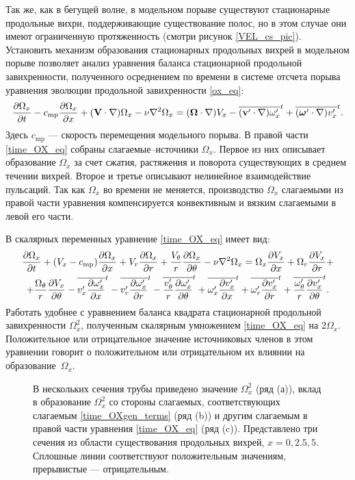 Так же, как в бегущей волне, в модельном порыве существуют стационарные продольные  вихри, поддерживающие существование полос, но в этом случае они имеют ограниченную протяженность (смотри рисунок \ref{VEL_cs_pic}). Установить механизм образования стационарных продольных вихрей в модельном порыве позволяет анализ уравнения баланса стационарной продольной завихренности, полученного осреднением по времени в системе отсчета порыва уравнения эволюции продольной завихренности \eqref{ox_eq}: 
\begin{equation} \label{time_OX_eq}
\frac{\partial \Omega_x}{\partial t} - c_\mathrm{mp} \frac{\partial \Omega_x}{\partial x} + (\mathbf{V} \cdot \nabla) \Omega_x - \nu\nabla^2 \Omega_x = (\mbox{\boldmath$\Omega$} \cdot \nabla) V_x - \overline{(\mathbf{v}' \cdot \nabla) \omega'_x}^t + \overline{(\mbox{\boldmath$\omega$}' \cdot \nabla) v'_x}^t.
\end{equation}
Здесь $c_\mathrm{mp}$ --- скорость перемещения модельного порыва. В правой части \eqref{time_OX_eq} собраны слагаемые--источники $\Omega_x$. Первое из них описывает образование $\Omega_x$ за счет сжатия, растяжения и поворота существующих в среднем течении вихрей. Второе и третье описывают нелинейное взаимодействие пульсаций. Так как $\Omega_x$ во времени не меняется, производство $\Omega_x$ слагаемыми из правой части уравнения компенсируется конвективным и вязким слагаемыми в левой его части. 

В скалярных переменных уравнение \eqref{time_OX_eq} имеет вид:
\begin{multline}\label{time_OX1_eq}
\frac{\partial \Omega_x}{\partial t} + (V_x - c_\mathrm{mp})\frac{\partial \Omega_x}{\partial x} + V_r \frac{\partial \Omega_x}{\partial r} + \frac{V_\theta}{r} \frac{\partial \Omega_x}{\partial \theta} - \nu\nabla^2\Omega_x= \Omega_x \frac{\partial V_x}{\partial x} + \Omega_r \frac{\partial V_x}{\partial r} + \\ + \frac{\Omega_\theta}{r} \frac{\partial V_x}{\partial \theta}
 - \overline{v'_x \frac{\partial \omega'_x}{\partial x}}^t - \overline{v'_r \frac{\partial \omega'_x}{\partial r}}^t - \overline{\frac{v'_\theta}{r} \frac{\partial \omega'_x}{\partial \theta}}^t
 + \overline{\omega'_x \frac{\partial v'_x}{\partial x}}^t + \overline{\omega'_r \frac{\partial v'_x}{\partial r}}^t + \overline{\frac{\omega'_\theta}{r} \frac{\partial v'_x}{\partial \theta}}^t.
\end{multline}
Работать удобнее с уравнением баланса квадрата стационарной продольной завихренности $\Omega_x^2$, полученным скалярным умножением \eqref{time_OX_eq} на $2\Omega_x$. Положительное или отрицательное значение источниковых членов в этом уравнении говорит о положительном или отрицательном их влиянии на образование~$\Omega_x$. 


\begin{figure}[h]
\caption{В нескольких сечения трубы приведено значение $\Omega_x^2$ (ряд (а)), вклад в образование $\Omega_x^2$ со стороны слагаемых, соответствующих слагаемым \eqref{time_OXgen_terms} (ряд (b)) и другим слагаемым в правой части уравнения \eqref{time_OX_eq} (ряд (c)). Представлено три сечения из области существования продольных вихрей, $x=0,2.5,5$. Сплошные линии соответствуют положительным значениям, прерывистые --- отрицательным.}
\label{mp_OXgen_pic}
\end{figure}

